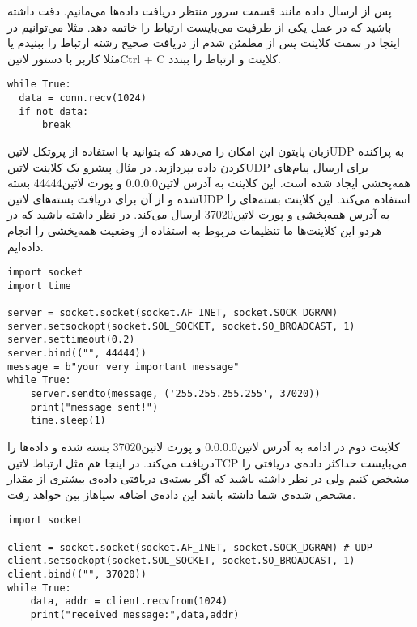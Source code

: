 \documentclass[]{article}
\begin{document}
  پس از ارسال داده مانند قسمت سرور منتظر دریافت داده‌ها می‌مانیم. دقت داشته باشید که در عمل یکی از طرفیت می‌بایست ارتباط را خاتمه دهد.
  مثلا می‌توانیم در اینجا در سمت کلاینت پس از مطمئن شدم از دریافت صحیح رشته ارتباط را ببنیدم یا مثلا کاربر با دستور ‌لاتین{Ctrl + C}
  کلاینت و ارتباط را ببندد.

  \begin{latin}
  \begin{verbatim}
while True:
  data = conn.recv(1024)
  if not data:
      break
  \end{verbatim}
  \end{latin}

  زبان پایتون این امکان را می‌دهد که بتوانید با استفاده از پروتکل ‌لاتین{UDP} به پراکنده کردن داده بپردازید.
  در مثال پیشرو یک کلاینت ‌لاتین{UDP} برای ارسال پیام‌های همه‌پخشی ایجاد شده است.
  این کلاینت به آدرس ‌لاتین{0.0.0.0} و پورت ‌لاتین{44444} بسته شده و از آن برای دریافت بسته‌های ‌لاتین{UDP} استفاده می‌کند.
  این کلاینت بسته‌های را به آدرس همه‌پخشی و پورت ‌لاتین{37020} ارسال می‌کند.
  در نظر داشته باشید که در هردو این کلاینت‌ها ما تنظیمات مربوط به استفاده از وضعیت همه‌پخشی را انجام داده‌ایم.

  \begin{latin}
  \begin{verbatim}
import socket
import time

server = socket.socket(socket.AF_INET, socket.SOCK_DGRAM)
server.setsockopt(socket.SOL_SOCKET, socket.SO_BROADCAST, 1)
server.settimeout(0.2)
server.bind(("", 44444))
message = b"your very important message"
while True:
    server.sendto(message, ('255.255.255.255', 37020))
    print("message sent!")
    time.sleep(1)
  \end{verbatim}
  \end{latin}

  کلاینت دوم در ادامه به آدرس ‌لاتین{0.0.0.0} و پورت ‌لاتین{37020} بسته شده و داده‌ها را دریافت می‌کند.
  در اینجا هم مثل ارتباط ‌لاتین{TCP} می‌بایست حداکثر داده‌ی دریافتی را مشخص کنیم ولی در نظر داشته باشید که اگر بسته‌ی دریافتی
  داده‌ی بیشتری از مقدار مشخص شده‌ی شما داشته باشد این داده‌ی اضافه ‌سیاه{از بین خواهد رفت}.

  \begin{latin}
  \begin{verbatim}
import socket

client = socket.socket(socket.AF_INET, socket.SOCK_DGRAM) # UDP
client.setsockopt(socket.SOL_SOCKET, socket.SO_BROADCAST, 1)
client.bind(("", 37020))
while True:
    data, addr = client.recvfrom(1024)
    print("received message:",data,addr)
  \end{verbatim}
  \end{latin}
\end{document}
